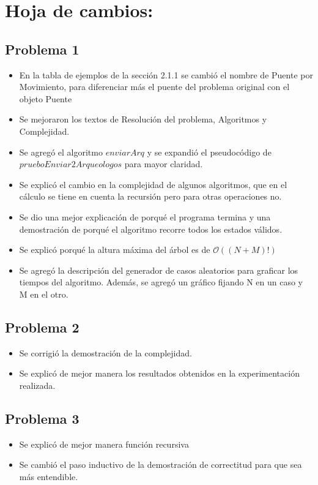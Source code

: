 \section{Hoja de cambios:}

\subsection{Problema 1}

\begin{itemize}

\item En la tabla de ejemplos de la sección 2.1.1 se cambió el nombre de Puente por Movimiento, para diferenciar más el puente del problema original con el objeto Puente

\item Se mejoraron los textos de Resolución del problema, Algoritmos y Complejidad.

\item Se agregó el algoritmo $enviarArq$ y se expandió el pseudocódigo de $prueboEnviar2Arqueologos$ para mayor claridad.

\item Se explicó el cambio en la complejidad de algunos algoritmos, que en el cálculo se tiene en cuenta la recursión pero para otras operaciones no.

\item Se dio una mejor explicación de porqué el programa termina y una demostración de porqué el algoritmo recorre todos los estados válidos.

\item Se explicó porqué la altura máxima del árbol es de $\mathcal{O}((N+M)!)$

\item Se agregó la descripción del generador de casos aleatorios para graficar los tiempos del algoritmo. Además, se agregó un gráfico fijando N en un caso y M en el otro.

\end{itemize}

\subsection{Problema 2}

\begin{itemize}

    \item Se corrigió la demostración de la complejidad.
    
    \item Se explicó de mejor manera los resultados obtenidos en la experimentación realizada.

\end{itemize}

\subsection{Problema 3}

\begin{itemize}
\item Se explicó de mejor manera función recursiva
\item Se cambió el paso inductivo de la demostración de correctitud para que sea más entendible.
\end{itemize}